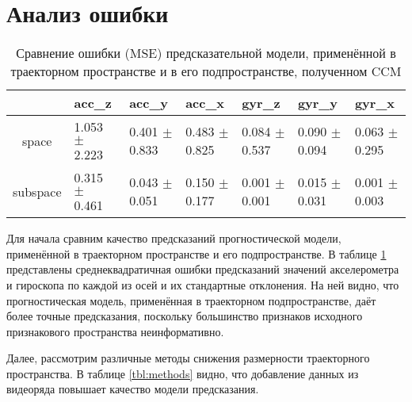 \documentclass[a4paper, 12pt]{article}
\begin{document}
\section{Анализ ошибки}
\begin{table}[bhtp]
	\fontsize{10pt}{14pt}
	\selectfont
	\centering
	\caption{Сравнение ошибки (MSE) предсказательной модели, применённой в траекторном пространстве и в его подпространстве, полученном CCM}
	\label{tbl:space_and_subspace}
	\begin{tabularx}{\textwidth}{c|XXXXXX}
		\hline
		& acc\_z & acc\_y & acc\_x & gyr\_z & gyr\_y & gyr\_x \\
		\hline
		space & 1.053 $\pm$ 2.223 & 0.401 $\pm$ 0.833 & 0.483 $\pm$ 0.825 & 0.084 $\pm$ 0.537 & 0.090 $\pm$ 0.094 & 0.063 $\pm$ 0.295 \\
		subspace & 0.315 $\pm$ 0.461 & 0.043 $\pm$ 0.051 & 0.150 $\pm$ 0.177 & 0.001 $\pm$ 0.001	& 0.015 $\pm$ 0.031 & 0.001 $\pm$ 0.003 \\
		\hline
	\end{tabularx}
\end{table}

Для начала сравним качество предсказаний прогностической модели, применённой в траекторном пространстве и его подпространстве.
В таблице \ref{tbl:space_and_subspace} представлены среднеквадратичная ошибки предсказаний значений акселерометра и гироскопа по каждой из осей и их стандартные отклонения. 
На ней видно, что прогностическая модель, применённая в траекторном подпространстве, даёт более точные предсказания, поскольку большинство признаков исходного признакового пространства неинформативно.

Далее, рассмотрим различные методы снижения размерности траекторного пространства. В таблице \ref{tbl:methods} видно, что добавление данных из видеоряда повышает качество модели предсказания.
\end{document}

